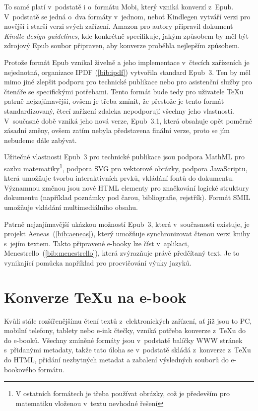 \documentclass{csbulletin}
\renewcommand\cite[1]{(\ref{#1})}
\begin{document}
To samé platí v~podstatě i o~formátu Mobi, který vzniká konverzí z~Epub.
V~podstatě se jedná o~dva formáty v~jednom, neboť Kindlegen vytváří verzi pro
novější i starší verzi svých zařízení. Amazon pro autory připravil dokument
\textit{Kindle design guidelines}, kde konkrétně specifikuje, jakým způsobem by
měl být zdrojový Epub soubor připraven, aby konverze proběhla nejlepším
způsobem.

Protože formát Epub vznikal živelně a jeho implementace v~čtecích zařízeních je
nejednotná, organizace IPDF \cite{bib:ipdf} vytvořila standard Epub~3. Ten by
měl mimo jiné zlepšit podporu pro technické publikace nebo pro asistenční
služby pro čtenáře se specifickými
potřebami. Tento formát bude tedy pro uživatele \TeX u patrně nejzajímavější,
ovšem je třeba zmínit, že přestože je tento formát standardizovaný, čtecí
zařízení zdaleka nepodporují všechny jeho vlastnosti. V~současné době vzniká
jeho nová verze, Epub~3.1, která obsahuje opět poměrně zásadní změny, ovšem
zatím nebyla představena finální verze, proto se jím nebudeme dále zabývat.

Užitečné vlastnosti Epub~3 pro technické publikace jsou podpora MathML
pro sazbu matematiky\footnote{V ostatních formátech je třeba používat obrázky,
což je především pro matematiku vloženou v~textu nevhodné řešení}, podpora SVG
pro vektorové obrázky, podpora JavaScriptu, která umožňuje tvorbu
interaktivních prvků, vkládání fontů do dokumentu.
Významnou změnou jsou  nové HTML elementy pro značkování logické struktury
dokumentu (například poznámky pod čarou, bibliografie, rejstřík). Formát SMIL
umožňuje vkládání multimediálního obsahu.

Patrně nejzajímavější ukázkou možností Epub~3, která v~současnosti existuje, je
projekt Aeneas~\cite{bib:aeneas}, který umožňuje
synchronizovat čtenou verzi knihy s~jejím textem. Takto připravené e-booky
lze číst v~aplikaci,
Menestrello~\cite{bib:menestrello}, která
zvýrazňuje právě předčítaný text. Je to vynikající pomůcka například pro
procvičování výuky jazyků.



\section{Konverze \TeX u na e-book}

Kvůli stále rozšířenějšímu čtení textů z~elektronických zařízení, ať již jsou
to PC, mobilní telefony, tablety nebo e-ink čtečky, vzniká potřeba konverze
z~\TeX u do do e-booků.  Všechny zmíněné formáty jsou v~podstatě balíčky WWW
stránek s~přidanými metadaty, takže tato úloha se v~podstatě skládá z~konverze
z~\TeX u do HTML, přidání nezbytných metadat a zabalení výsledných souborů do
e-bookového formátu.
\end{document}
